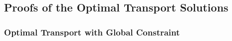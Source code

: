     
    


\subsection{Proofs of the Optimal Transport Solutions}

\subsubsection{Optimal Transport with Global Constraint}\label{sec:proof_global}

